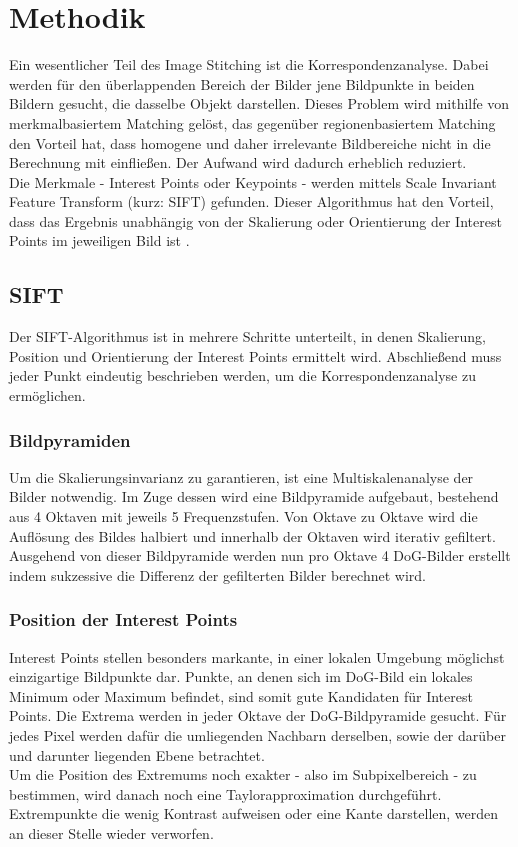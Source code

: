 \documentclass[deutsch]{scrartcl}
\begin{document}
\section{Methodik}
Ein wesentlicher Teil des Image Stitching ist die Korrespondenzanalyse. Dabei werden für den überlappenden Bereich der Bilder jene Bildpunkte in beiden Bildern gesucht, die dasselbe Objekt darstellen. Dieses Problem wird mithilfe von merkmalbasiertem Matching gelöst, das gegenüber regionenbasiertem Matching den Vorteil hat, dass homogene und daher irrelevante Bildbereiche nicht in die Berechnung mit einfließen. Der Aufwand wird dadurch erheblich reduziert. \cite{evc14} \\
Die Merkmale - Interest Points oder Keypoints - werden mittels Scale Invariant Feature Transform (kurz: SIFT) \cite{lowe04} gefunden. Dieser Algorithmus hat den Vorteil, dass das Ergebnis unabhängig von der Skalierung oder Orientierung der Interest Points im jeweiligen Bild ist \cite{evc14}.

\subsection{SIFT}
Der SIFT-Algorithmus ist in mehrere Schritte unterteilt, in denen Skalierung, Position und Orientierung der Interest Points ermittelt wird. Abschließend muss jeder Punkt eindeutig beschrieben werden, um die Korrespondenzanalyse zu ermöglichen.

\subsubsection{Bildpyramiden}
Um die Skalierungsinvarianz zu garantieren, ist eine Multiskalenanalyse der Bilder notwendig. Im Zuge dessen wird eine Bildpyramide aufgebaut, bestehend aus 4 Oktaven mit jeweils 5 Frequenzstufen. Von Oktave zu Oktave wird die Auflösung des Bildes halbiert und innerhalb der Oktaven wird iterativ gefiltert. \\
Ausgehend von dieser Bildpyramide werden nun pro Oktave 4 DoG-Bilder erstellt indem sukzessive die Differenz der gefilterten Bilder berechnet wird. 

\subsubsection{Position der Interest Points}
Interest Points stellen besonders markante, in einer lokalen Umgebung möglichst einzigartige Bildpunkte dar. Punkte, an denen sich im DoG-Bild ein lokales Minimum oder Maximum befindet, sind somit gute Kandidaten für Interest Points. Die Extrema werden in jeder Oktave der DoG-Bildpyramide gesucht. Für jedes Pixel werden dafür die umliegenden Nachbarn derselben, sowie der darüber und darunter liegenden Ebene betrachtet.\\
Um die Position des Extremums noch exakter - also im Subpixelbereich - zu bestimmen, wird danach noch eine Taylorapproximation durchgeführt.\\
Extrempunkte die wenig Kontrast aufweisen oder eine Kante darstellen, werden an dieser Stelle wieder verworfen. 
\end{document}
